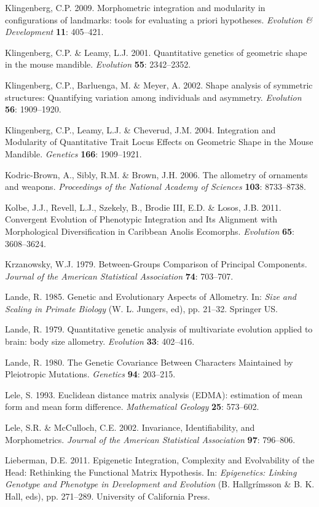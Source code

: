 \documentclass[12pt,twoside]{report}
\begin{document}
Klingenberg, C.P. 2009. Morphometric integration and modularity in
configurations of landmarks: tools for evaluating a priori hypotheses.
\emph{Evolution \& Development} \textbf{11}: 405--421.

Klingenberg, C.P. \& Leamy, L.J. 2001. Quantitative genetics of
geometric shape in the mouse mandible. \emph{Evolution} \textbf{55}:
2342--2352.

Klingenberg, C.P., Barluenga, M. \& Meyer, A. 2002. Shape analysis of
symmetric structures: Quantifying variation among individuals and
asymmetry. \emph{Evolution} \textbf{56}: 1909--1920.

Klingenberg, C.P., Leamy, L.J. \& Cheverud, J.M. 2004. Integration and
Modularity of Quantitative Trait Locus Effects on Geometric Shape in the
Mouse Mandible. \emph{Genetics} \textbf{166}: 1909--1921.

Kodric-Brown, A., Sibly, R.M. \& Brown, J.H. 2006. The allometry of
ornaments and weapons. \emph{Proceedings of the National Academy of
Sciences} \textbf{103}: 8733--8738.

Kolbe, J.J., Revell, L.J., Szekely, B., Brodie III, E.D. \& Losos, J.B.
2011. Convergent Evolution of Phenotypic Integration and Its Alignment
with Morphological Diversification in Caribbean Anolis Ecomorphs.
\emph{Evolution} \textbf{65}: 3608--3624.

Krzanowsky, W.J. 1979. Between-Groups Comparison of Principal
Components. \emph{Journal of the American Statistical Association}
\textbf{74}: 703--707.

Lande, R. 1985. Genetic and Evolutionary Aspects of Allometry. In:
\emph{Size and Scaling in Primate Biology} (W. L. Jungers, ed), pp.
21--32. Springer US.

Lande, R. 1979. Quantitative genetic analysis of multivariate evolution
applied to brain: body size allometry. \emph{Evolution} \textbf{33}:
402--416.

Lande, R. 1980. The Genetic Covariance Between Characters Maintained by
Pleiotropic Mutations. \emph{Genetics} \textbf{94}: 203--215.

Lele, S. 1993. Euclidean distance matrix analysis (EDMA): estimation of
mean form and mean form difference. \emph{Mathematical Geology}
\textbf{25}: 573--602.

Lele, S.R. \& McCulloch, C.E. 2002. Invariance, Identifiability, and
Morphometrics. \emph{Journal of the American Statistical Association}
\textbf{97}: 796--806.

Lieberman, D.E. 2011. Epigenetic Integration, Complexity and
Evolvability of the Head: Rethinking the Functional Matrix Hypothesis.
In: \emph{Epigenetics: Linking Genotype and Phenotype in Development and
Evolution} (B. Hallgrímsson \& B. K. Hall, eds), pp. 271--289.
University of California Press.
\end{document}
